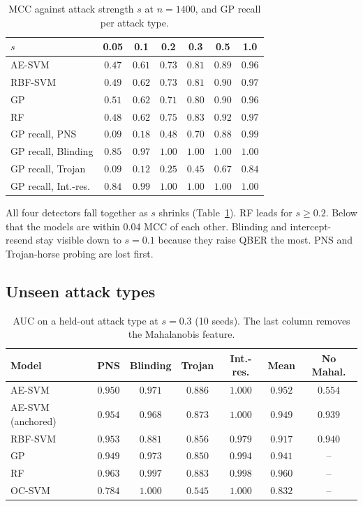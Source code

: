 \documentclass[conference,10pt]{IEEEtran}
\begin{document}
\begin{table}[t]
  \centering
  \caption{MCC against attack strength $s$ at $n=1400$, and GP recall per attack type.}
  \label{tab:strength}
  \footnotesize
  \setlength{\tabcolsep}{3pt}
  \begin{tabular}{lcccccc}
    \toprule
    $s$ & 0.05 & 0.1 & 0.2 & 0.3 & 0.5 & 1.0 \\
    \midrule
    AE-SVM & $0.47$ & $0.61$ & $0.73$ & $0.81$ & $0.89$ & $0.96$ \\
    RBF-SVM & $0.49$ & $0.62$ & $0.73$ & $0.81$ & $0.90$ & $0.97$ \\
    GP & $0.51$ & $0.62$ & $0.71$ & $0.80$ & $0.90$ & $0.96$ \\
    RF & $0.48$ & $0.62$ & $0.75$ & $0.83$ & $0.92$ & $0.97$ \\
    \midrule
    GP recall, PNS & $0.09$ & $0.18$ & $0.48$ & $0.70$ & $0.88$ & $0.99$ \\
    GP recall, Blinding & $0.85$ & $0.97$ & $1.00$ & $1.00$ & $1.00$ & $1.00$ \\
    GP recall, Trojan & $0.09$ & $0.12$ & $0.25$ & $0.45$ & $0.67$ & $0.84$ \\
    GP recall, Int.-res. & $0.84$ & $0.99$ & $1.00$ & $1.00$ & $1.00$ & $1.00$ \\
    \bottomrule
  \end{tabular}
\end{table}

All four detectors fall together as $s$ shrinks (Table~\ref{tab:strength}). RF
leads for $s\ge0.2$. Below that the models are within 0.04 MCC of each other.
Blinding and intercept-resend stay visible down to $s=0.1$ because they raise
QBER the most. PNS and Trojan-horse probing are lost first.

\subsection{Unseen attack types}

\begin{table}[t]
  \centering
  \caption{AUC on a held-out attack type at $s=0.3$ (10 seeds). The last column removes the Mahalanobis feature.}
  \label{tab:zd}
  \footnotesize
  \setlength{\tabcolsep}{2.5pt}
  \begin{tabular}{lcccccc}
    \toprule
    Model & PNS & Blinding & Trojan & Int.-res. & Mean & No Mahal. \\
    \midrule
    AE-SVM & $0.950$ & $0.971$ & $0.886$ & $1.000$ & $0.952$ & $0.554$ \\
    AE-SVM (anchored) & $0.954$ & $0.968$ & $0.873$ & $1.000$ & $0.949$ & $0.939$ \\
    RBF-SVM & $0.953$ & $0.881$ & $0.856$ & $0.979$ & $0.917$ & $0.940$ \\
    GP & $0.949$ & $0.973$ & $0.850$ & $0.994$ & $0.941$ & -- \\
    RF & $0.963$ & $0.997$ & $0.883$ & $0.998$ & $0.960$ & -- \\
    OC-SVM & $0.784$ & $1.000$ & $0.545$ & $1.000$ & $0.832$ & -- \\
    \bottomrule
  \end{tabular}
\end{table}
\end{document}
